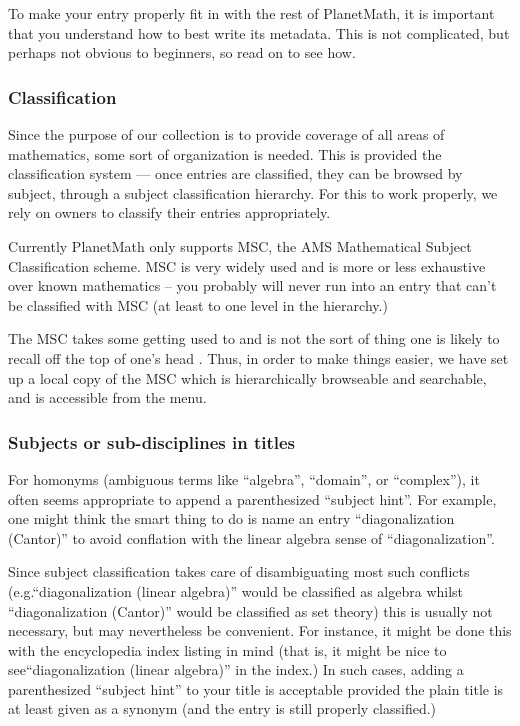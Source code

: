 To make your entry properly fit in with the rest of PlanetMath, it is
important that you understand how to best write its metadata. This is
not complicated, but perhaps not obvious to beginners, so read on to
see how.

\subsubsection{Classification}
Since the purpose of our collection is to provide coverage of all areas
of mathematics, some sort of organization is needed.  This is provided
the classification system --- once entries are classified, they can be
 browsed by subject, through a subject classification hierarchy. For 
this to work properly, we rely on owners to classify their entries 
appropriately.

Currently PlanetMath only supports MSC, the AMS Mathematical Subject 
Classification scheme. MSC is very widely used and is more or less 
exhaustive over known mathematics -- you probably will never run into 
an entry that can't be classified with MSC (at least to one level in the
 hierarchy.)

The MSC takes some getting used to and is not the sort of thing one
is likely to recall off the top of one's head . Thus, in order to make things 
easier, we have set up a local copy of the MSC which is hierarchically 
browseable and searchable, and is accessible from the menu.

\subsubsection{Subjects or sub-disciplines in titles}
For homonyms (ambiguous terms like ``algebra'', ``domain'', or
``complex''), it often seems appropriate to append a parenthesized
``subject hint''. For example, one might think the smart thing to do
is name an entry ``diagonalization (Cantor)'' to avoid conflation with
the linear algebra sense of ``diagonalization''. 

Since subject classification takes care of disambiguating most such conflicts 
(e.g.``diagonalization (linear algebra)'' would be classified as algebra
 whilst ``diagonalization (Cantor)'' would be classified as set theory)
this is usually not necessary, but may nevertheless be convenient.
For instance, it might be done this with the encyclopedia index listing 
in mind (that is, it might be nice to see``diagonalization (linear algebra)''
in the index.)  In such cases, adding a parenthesized ``subject hint'' to 
your title is acceptable provided the plain title is at least given as a 
synonym (and the entry is still properly classified.) 

